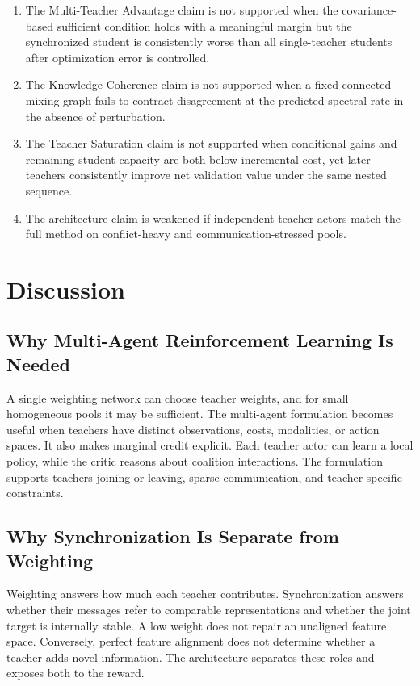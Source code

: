 \documentclass[10pt,twocolumn,a4paper]{article}
\begin{document}
\begin{enumerate}
    \item The Multi-Teacher Advantage claim is not supported when the covariance-based sufficient condition holds with a meaningful margin but the synchronized student is consistently worse than all single-teacher students after optimization error is controlled.
    \item The Knowledge Coherence claim is not supported when a fixed connected mixing graph fails to contract disagreement at the predicted spectral rate in the absence of perturbation.
    \item The Teacher Saturation claim is not supported when conditional gains and remaining student capacity are both below incremental cost, yet later teachers consistently improve net validation value under the same nested sequence.
    \item The architecture claim is weakened if independent teacher actors match the full method on conflict-heavy and communication-stressed pools.
\end{enumerate}

\section{Discussion}
\label{sec:discussion}

\subsection{Why Multi-Agent Reinforcement Learning Is Needed}

A single weighting network can choose teacher weights, and for small homogeneous pools it may be sufficient. The multi-agent formulation becomes useful when teachers have distinct observations, costs, modalities, or action spaces. It also makes marginal credit explicit. Each teacher actor can learn a local policy, while the critic reasons about coalition interactions. The formulation supports teachers joining or leaving, sparse communication, and teacher-specific constraints.

\subsection{Why Synchronization Is Separate from Weighting}

Weighting answers how much each teacher contributes. Synchronization answers whether their messages refer to comparable representations and whether the joint target is internally stable. A low weight does not repair an unaligned feature space. Conversely, perfect feature alignment does not determine whether a teacher adds novel information. The architecture separates these roles and exposes both to the reward.
\end{document}
